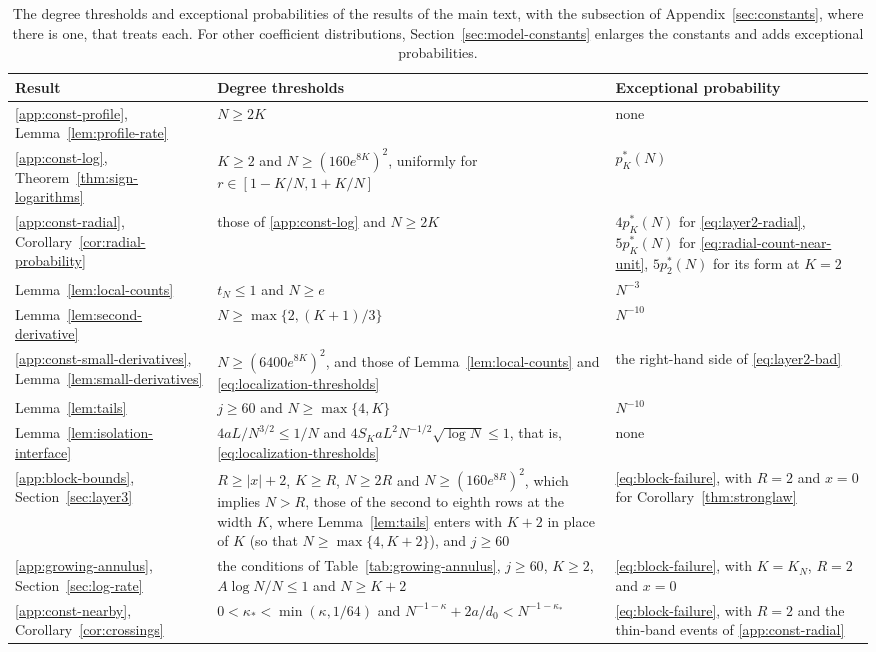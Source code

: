 \begin{table}[!ht]
\centering
\small
\setlength{\tabcolsep}{4pt}
\begin{tabular}{@{}>{\raggedright\arraybackslash}p{}
>{\raggedright\arraybackslash}p{}
>{\raggedright\arraybackslash}p{}@{}}
\toprule
Result & Degree thresholds & Exceptional probability\\
\midrule
\ref{app:const-profile}, Lemma~\ref{lem:profile-rate}
 & $N\ge2K$ & none\\
\ref{app:const-log}, Theorem~\ref{thm:sign-logarithms}
 & $K\ge2$ and $N\ge(160e^{8K})^2$, uniformly for $r\in[1-K/N,1+K/N]$
 & $p_K^*(N)$\\
\ref{app:const-radial}, Corollary~\ref{cor:radial-probability}
 & those of \ref{app:const-log} and $N\ge2K$
 & $4p_K^*(N)$ for \eqref{eq:layer2-radial}, $5p_K^*(N)$ for
 \eqref{eq:radial-count-near-unit}, $5p_2^*(N)$ for its form at $K=2$\\
Lemma~\ref{lem:local-counts}
 & $t_N\le1$ and $N\ge e$ & $N^{-3}$\\
Lemma~\ref{lem:second-derivative}
 & $N\ge\max\{2,(K+1)/3\}$ & $N^{-10}$\\
\ref{app:const-small-derivatives}, Lemma~\ref{lem:small-derivatives}
 & $N\ge(6400e^{8K})^2$, and those of Lemma~\ref{lem:local-counts}
 and \eqref{eq:localization-thresholds}
 & the right-hand side of \eqref{eq:layer2-bad}\\
Lemma~\ref{lem:tails}
 & $j\ge60$ and $N\ge\max\{4,K\}$ & $N^{-10}$\\
Lemma~\ref{lem:isolation-interface}
 & $4aL/N^{3/2}\le1/N$ and $4S_KaL^2N^{-1/2}\sqrt{\log N}\le1$,
 that is, \eqref{eq:localization-thresholds} & none\\
\ref{app:block-bounds}, Section~\ref{sec:layer3}
 & $R\ge|x|+2$, $K\ge R$, $N\ge2R$ and $N\ge(160e^{8R})^2$, which implies
 $N>R$, those of the second to eighth rows at the
 width $K$, where Lemma~\ref{lem:tails} enters with $K+2$ in place of
 $K$ (so that $N\ge\max\{4,K+2\}$), and $j\ge60$
 & \eqref{eq:block-failure}, with $R=2$ and $x=0$ for
 Corollary~\ref{thm:stronglaw}\\
\ref{app:growing-annulus}, Section~\ref{sec:log-rate}
 & the conditions of Table~\ref{tab:growing-annulus}, $j\ge60$, $K\ge2$,
 $A\log N/N\le1$ and $N\ge K+2$
 & \eqref{eq:block-failure}, with $K=K_N$, $R=2$ and $x=0$\\
\ref{app:const-nearby}, Corollary~\ref{cor:crossings}
 & $0<\kappa_*<\min(\kappa,1/64)$ and
 $N^{-1-\kappa}+2a/d_0<N^{-1-\kappa_*}$
 & \eqref{eq:block-failure}, with $R=2$ and the thin-band events of
 \ref{app:const-radial}\\
\bottomrule
\end{tabular}
\caption{The degree thresholds and exceptional probabilities of the
results of the main text, with the subsection of
Appendix~\ref{sec:constants}, where there is one, that treats each. For other coefficient
distributions, Section~\ref{sec:model-constants} enlarges the constants
and adds exceptional probabilities.}
\label{tab:const-summary}
\end{table}

